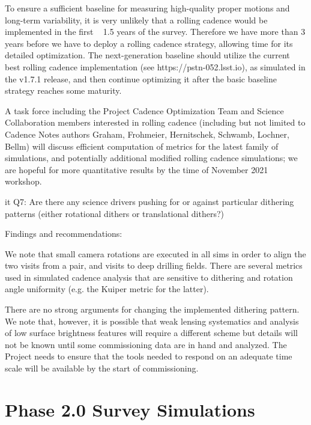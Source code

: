 To ensure a sufficient baseline for measuring high-quality proper motions and long-term variability, it is very unlikely that a rolling cadence would be implemented in the first ~ 1.5 years of the survey. Therefore we have more than 3 years before we have to deploy a rolling cadence strategy, allowing time for its detailed optimization. The next-generation baseline should utilize the current best rolling cadence implementation (see https://pstn-052.lsst.io), as simulated in the v1.7.1 release, and then continue optimizing it after the basic baseline strategy reaches some maturity. 

A task force including the Project Cadence Optimization Team and Science Collaboration members interested in rolling cadence (including but not limited to Cadence Notes authors Graham, Frohmeier, Hernitschek, Schwamb, Lochner, Bellm) will discuss efficient computation of metrics for the latest family of simulations, and potentially additional modified rolling cadence simulations; we are hopeful for more quantitative results by the time of November 2021 workshop.


{it Q7:  Are there any science drivers pushing for or against particular dithering patterns (either rotational dithers or translational dithers?)  }

Findings and recommendations:

We note that small camera rotations are executed in all sims in order to align the two visits from a pair, and visits to deep drilling fields. There are several metrics used in simulated cadence analysis that are sensitive to dithering and rotation angle uniformity (e.g. the Kuiper metric for the latter). 

There are no strong arguments for changing the implemented dithering pattern. We note that, however, it is possible that weak lensing systematics and analysis of low surface brightness features will require a different scheme but details will not be known until some commissioning data are in hand and analyzed. The Project needs to ensure that the tools needed to respond on an adequate time scale will be available by the start of commissioning. 
 


\section{Phase 2.0 Survey Simulations}

